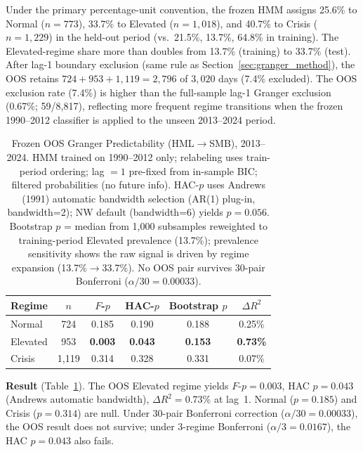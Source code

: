 \documentclass[sigconf,anonymous]{acmart}
\begin{document}
Under the primary percentage-unit convention, the frozen HMM assigns
25.6\% to Normal ($n = 773$), 33.7\% to Elevated
($n = 1{,}018$), and 40.7\% to Crisis ($n = 1{,}229$)
in the held-out period (vs.\ 21.5\%, 13.7\%, 64.8\% in training).
The Elevated-regime share more than doubles from 13.7\% (training)
to 33.7\% (test).
After lag-1 boundary exclusion (same rule as Section~\ref{sec:granger_method}),
the OOS retains $724 + 953 + 1{,}119 = 2{,}796$ of $3{,}020$ days (7.4\% excluded).
The OOS exclusion rate (7.4\%) is higher than the full-sample lag-1 Granger exclusion
(0.67\%; 59/8{,}817), reflecting more frequent regime transitions when the
frozen 1990--2012 classifier is applied to the unseen 2013--2024 period.

\begin{table}[t]
\centering
\setlength{\tabcolsep}{5pt}
\caption{Frozen OOS Granger Predictability (HML$\to$SMB), 2013--2024.
HMM trained on 1990--2012 only; relabeling uses train-period ordering;
lag $= 1$ pre-fixed from in-sample BIC; filtered probabilities (no future info).
HAC-$p$ uses Andrews (1991) automatic bandwidth selection (AR(1) plug-in, bandwidth=2);
NW default (bandwidth=6) yields $p = 0.056$.
Bootstrap $p$ = median from 1,000 subsamples reweighted to training-period
Elevated prevalence (13.7\%); prevalence sensitivity shows the raw signal
is driven by regime expansion (13.7\%$\to$33.7\%).
No OOS pair survives 30-pair Bonferroni ($\alpha/30 = 0.00033$).}
\label{tab:frozen_granger}
\small
\begin{tabular}{@{}lccccc@{}}
\toprule
Regime & $n$ & $F$-$p$ & HAC-$p$ & Bootstrap $p$ & $\Delta R^2$ \\
\midrule
Normal    & 724 & 0.185 & 0.190 & 0.188 & 0.25\% \\
Elevated  & 953 & \textbf{0.003} & \textbf{0.043} & \textbf{0.153} & \textbf{0.73\%} \\
Crisis    & 1,119 & 0.314 & 0.328 & 0.331 & 0.07\% \\
\bottomrule
\end{tabular}
\end{table}

\textbf{Result} (Table~\ref{tab:frozen_granger}). The OOS Elevated regime yields
$F$-$p = 0.003$, HAC $p = 0.043$ (Andrews automatic bandwidth),
$\Delta R^2 = 0.73\%$ at lag~1. Normal ($p = 0.185$) and Crisis ($p = 0.314$) are null.
Under 30-pair Bonferroni correction ($\alpha/30 = 0.00033$), the OOS result does not
survive; under 3-regime Bonferroni ($\alpha/3 = 0.0167$), the HAC $p = 0.043$ also fails.
\end{document}
